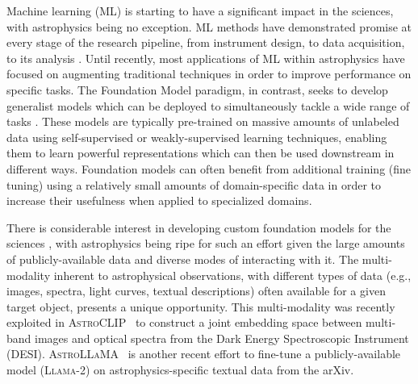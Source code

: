 \documentclass[10pt]{article} %
\begin{document}
Machine learning (ML) is starting to have a significant impact in the sciences, with astrophysics being no exception.
%
ML methods have demonstrated promise at every stage of the research pipeline, from instrument design, to data acquisition, to its analysis \citep{huertas2022dawes}.
%
Until recently, most applications of ML within astrophysics have focused on augmenting traditional techniques in order to improve performance on specific tasks.
%
The {Foundation Model} paradigm, in contrast, seeks to develop generalist models which can be deployed to simultaneously tackle a wide range of tasks \citep{bommasani2021opportunities}.
%
%
These models are typically pre-trained on massive amounts of unlabeled data using self-supervised or weakly-supervised learning techniques, enabling them to learn powerful representations which can then be used downstream in different ways.
%
Foundation models can often benefit from additional training ({fine tuning}) using a relatively small amounts of domain-specific data in order to increase their usefulness when applied to specialized domains.

There is considerable interest in developing custom foundation models for the sciences \citep[e.g., ][]{batatia2023foundation,subramanian2023towards}, with astrophysics being ripe for such an effort given the large amounts of publicly-available data and diverse modes of interacting with it.
%
The multi-modality inherent to astrophysical observations, with different types of data (e.g., images, spectra, light curves, textual descriptions) often available for a given target object, presents a unique opportunity.
%
This multi-modality was recently exploited in \textsc{AstroCLIP}~\citep{lanusse2023astroclip} to construct a joint embedding space between multi-band images and optical spectra from the Dark Energy Spectroscopic Instrument (DESI).
%
\textsc{AstroLLaMA}~\citep{nguyen2023astrollama,perkowski2024astrollama} is another recent effort to fine-tune a publicly-available model (\textsc{Llama-2}) on astrophysics-specific textual data from the arXiv.
\end{document}
